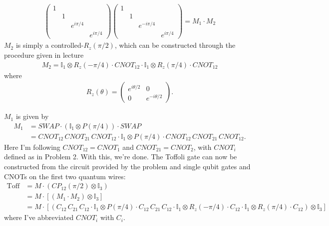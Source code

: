 \documentclass{article}
\theoremstyle{definition}
\begin{document}
\begin{enumerate}[label=(\alph*)]
\begin{align*}
\begin{pmatrix}
		1&&&\\
		&1&&\\
		&&e^{i\pi/4}&\\
		&&&e^{i\pi/4}
	\end{pmatrix}
\begin{pmatrix}
	1&&&\\
	&1&&\\
	&&e^{-i\pi/4}&\\
	&&&e^{i\pi/4}
\end{pmatrix} = M_1 \cdot M_2
\end{align*}
$M_2$ is simply a controlled-$R_z(\pi/2)$, which can be constructed through the procedure given in lecture
\begin{align*}
	M_2 = \mathbb{I}_1\otimes R_z(-\pi/4) \cdot CNOT_{12} \cdot \mathbb{I}_1\otimes R_z(\pi/4) \cdot CNOT_{12}
\end{align*}
where
\begin{align*}
	R_z(\theta) = \begin{pmatrix}
		e^{i\theta/2} & 0 \\ 0 & e^{-i\theta/2}
	\end{pmatrix}.
\end{align*}

$M_1$ is given by 
\begin{align*}
	M_1 &= SWAP \cdot (\mathbb{I}_1\otimes P(\pi/4)) \cdot SWAP \\
	&= CNOT_{12}\,CNOT_{21}\, CNOT_{12} \cdot \mathbb{I}_1\otimes P(\pi/4) \cdot CNOT_{12}\, CNOT_{21}\, CNOT_{12}.
\end{align*}
Here I'm following $CNOT_{12} = CNOT_1$ and $CNOT_{21} = CNOT_2$, with $CNOT_i$ defined as in Problem 2. With this, we're done. The Toffoli gate can now be constructed from the circuit provided by the problem and single qubit gates and CNOTs on the first two quantum wires:
\begin{align*}
	\text{Toff} 
	&= M\cdot ( CP_{12}(\pi/2) \otimes \mathbb{I}_3)\\
	&= M\cdot  [ (M_1\cdot M_2) \otimes \mathbb{I}_3] \\
	&= M\cdot [ (C_{12}\,C_{21}\, C_{12} \cdot \mathbb{I}_1\otimes P(\pi/4) \cdot C_{12}\, C_{21}\, C_{12}\cdot \mathbb{I}_1\otimes R_z(-\pi/4) \cdot C_{12} \cdot \mathbb{I}_1\otimes R_z(\pi/4)\cdot C_{12} ) \otimes \mathbb{I}_3]
\end{align*}
where I've abbreviated $CNOT_i$ with $C_i$.



\end{enumerate}
\end{document}

